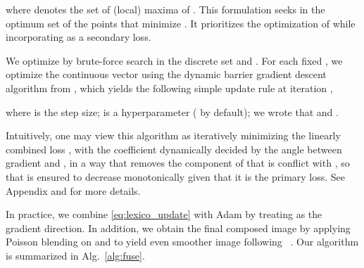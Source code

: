 \documentclass[10pt,twocolumn,letterpaper]{article}
\newcommand{\ourloss}{\texttt{AugCLIP}}
\begin{document}
where    denotes the set of (local) maxima of . 
This formulation seeks in the optimum set of  the points that minimize . It prioritizes the optimization of  while incorporating  as a secondary loss. 




\iffalse
Intuitively, the above optimization problem tries to find a solution that minimizes the perceptual distance between the foreground image  and the background patch  while keeps the composed image  on the manifold that maximizes the \ourloss~score with respect to the query text . 
\fi


\iffalse 
Bi-level optimization problems are known to be hard to solve \cite{solodov2007bundle, sinha2017review}.
Classical approaches either require time-consuming procedure that solves the inner and outer optimization iteratively~\cite{solodov2007bundle, sinha2017review}, or replace the bi-level optimization with a linearized relaxation~\cite{liu2018darts}. 
To efficiently solve the optimization problom~\eqref{eq:bilevel}, we instead adopt a recently-proposed Dynamic Barrier Gradient Descent (DBGD) algorithm~\cite{gong2021biobjective, gong2021automatic}. 
Unlike most of the algorithm for solving bi-level optimization that usually involves an burdensome inner loop and an outer loop, 
DBGD only requires the first-order derivative of the two objectives while still guarantees convergence to the local optimum. DBGD updates  with the following update rule,
\fi 
We optimize  by brute-force search in the discrete set  and . For each fixed , we optimize the continuous vector  using the dynamic barrier gradient descent algorithm from \cite{gong2021biobjective},  
which yields the following simple update rule at iteration , 

\iffalse 

\fi 
where  is the step size;  is a hyperparameter ( by default); 
we wrote that
  and 
. 
    
    Intuitively, one may view this algorithm as iteratively minimizing the linearly combined loss , with the coefficient   dynamically decided by the angle between gradient  and , in a way that removes the component of  that is conflict with , so that 
     is ensured to decrease monotonically given that it is the primary loss.   
See Appendix and \cite{gong2021automatic}  for more details. 


In practice, we combine \eqref{eq:lexico_update} with Adam by treating  as the gradient direction. In addition, we obtain the final composed image by applying  Poisson blending on  and  to yield even smoother image  following ~\cite{huh2020transforming}. 
Our algorithm is summarized in Alg.~\ref{alg:fuse}.
\end{document}
